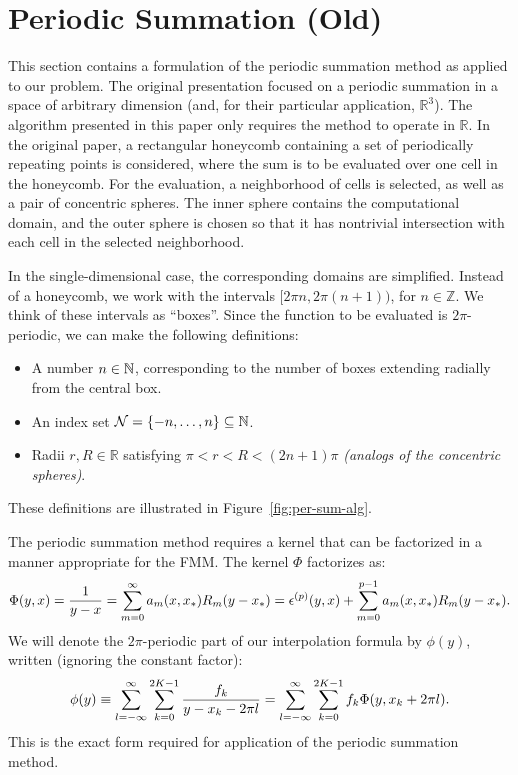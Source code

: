 \section{Periodic Summation (Old)}

This section contains a formulation of the periodic summation method
as applied to our problem. The original presentation focused on a
periodic summation in a space of arbitrary dimension (and, for their
particular application, $\mathbb{R}^3$).  The algorithm presented in
this paper only requires the method to operate in $\mathbb{R}$. In the
original paper, a rectangular honeycomb containing a set of
periodically repeating points is considered, where the sum is to be
evaluated over one cell in the honeycomb. For the evaluation, a
neighborhood of cells is selected, as well as a pair of concentric
spheres. The inner sphere contains the computational domain, and the
outer sphere is chosen so that it has nontrivial intersection with
each cell in the selected neighborhood.

In the single-dimensional case, the corresponding domains are
simplified. Instead of a honeycomb, we work with the intervals
$[2\pi n, 2\pi (n + 1))$, for $n \in \mathbb{Z}$. We think of these
intervals as ``boxes''. Since the function to be evaluated is
$2\pi$-periodic, we can make the following definitions:
\begin{itemize}
\item A number $n \in \mathbb{N}$, corresponding to the number of boxes
  extending radially from the central box.
\item An index set
  $\mathcal{N} = \left\{-n, \hdots, n\right\} \subseteq \mathbb{N}$.
\item Radii $r, R \in \mathbb{R}$ satisfying
  $\pi < r < R < (2n + 1)\pi$ \emph{(analogs of the concentric
    spheres)}.
\end{itemize}
These definitions are illustrated in Figure~\ref{fig:per-sum-alg}.

The periodic summation method requires a kernel that can be factorized
in a manner appropriate for the FMM. The kernel $\Phi$ factorizes as:
\begin{align*}
  \Phi(y, x) = {1 \over y - x} = \sum_{m=0}^\infty a_m(x, x_*) R_m(y - x_*) = \epsilon^{(p)}(y,x) + \sum_{m=0}^{p-1} a_m(x, x_*) R_m(y - x_*).
\end{align*}
We will denote the $2\pi$-periodic
part of our interpolation formula by $\phi(y)$,
written (ignoring the constant factor):
\begin{align*}
  \phi(y) \equiv \sum_{l=-\infty}^\infty \sum_{k=0}^{2K-1} {f_k \over y - x_k - 2\pi l} = \sum_{l=-\infty}^\infty \sum_{k=0}^{2K-1} f_k \Phi(y, x_k + 2\pi l).
\end{align*}
This is the exact form required for application of the periodic
summation method.

